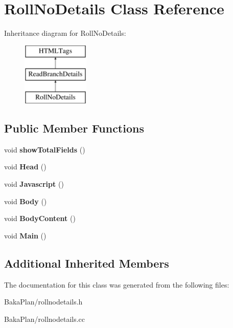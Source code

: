 \hypertarget{classRollNoDetails}{\section{Roll\-No\-Details Class Reference}
\label{classRollNoDetails}
}
Inheritance diagram for Roll\-No\-Details\-:\begin{figure}[H]
\begin{center}
\leavevmode
\includegraphics[height=3.000000cm]{classRollNoDetails}
\end{center}
\end{figure}
\subsection*{Public Member Functions}
\begin{DoxyCompactItemize}
\item 
\hypertarget{classRollNoDetails_a1a73466ff174536c74ac9bcace561c83}{void {\bfseries show\-Total\-Fields} ()}\label{classRollNoDetails_a1a73466ff174536c74ac9bcace561c83}

\item 
\hypertarget{classRollNoDetails_ad3fa3bfcba84e65264f12627095da3d6}{void {\bfseries Head} ()}\label{classRollNoDetails_ad3fa3bfcba84e65264f12627095da3d6}

\item 
\hypertarget{classRollNoDetails_a2f81605e7a0fc1305b0c568bf1d26b8c}{void {\bfseries Javascript} ()}\label{classRollNoDetails_a2f81605e7a0fc1305b0c568bf1d26b8c}

\item 
\hypertarget{classRollNoDetails_aeadbb26bf6e93895d69af83ec4bb40a0}{void {\bfseries Body} ()}\label{classRollNoDetails_aeadbb26bf6e93895d69af83ec4bb40a0}

\item 
\hypertarget{classRollNoDetails_a22c4dd142eebe3cfaf220b6080257082}{void {\bfseries Body\-Content} ()}\label{classRollNoDetails_a22c4dd142eebe3cfaf220b6080257082}

\item 
\hypertarget{classRollNoDetails_aef87b13056bb753c31e43021df9764c4}{void {\bfseries Main} ()}\label{classRollNoDetails_aef87b13056bb753c31e43021df9764c4}

\end{DoxyCompactItemize}
\subsection*{Additional Inherited Members}


The documentation for this class was generated from the following files\-:\begin{DoxyCompactItemize}
\item 
Baka\-Plan/rollnodetails.\-h\item 
Baka\-Plan/rollnodetails.\-cc\end{DoxyCompactItemize}
